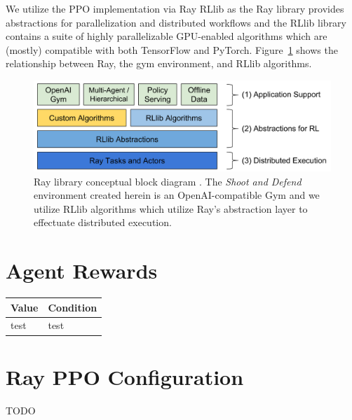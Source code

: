\documentclass{article}
\begin{document}
\noindent
We utilize the PPO implementation via Ray RLlib \cite{ray_ppo} as the Ray library provides abstractions for parallelization and distributed workflows and the RLlib library contains a suite of highly parallelizable GPU-enabled algorithms which are (mostly) compatible with both TensorFlow and PyTorch. 
Figure~\ref{fig:ray_blockdiagram} shows the relationship between Ray, the gym environment, and RLlib algorithms. 

\begin{figure}
  \includegraphics[width=\linewidth]{imgs/ray_blockdiagram}
  \caption{Ray library conceptual block diagram \cite{ray_ppo}. The \textit{Shoot and Defend} environment created herein is an OpenAI-compatible Gym and we utilize RLlib algorithms which utilize Ray's abstraction layer to effectuate distributed execution.}
  \label{fig:ray_blockdiagram}
\end{figure}


\newpage
\appendix
\section{Agent Rewards}\label{app:rewards}
\begin{tabular}{ | l | l | }
\hline
Value & Condition \\ \hline
test & test \\ \hline

\end{tabular}

\section{Ray PPO Configuration} \label{app:ray_config}
TODO


\newpage


\end{document}
